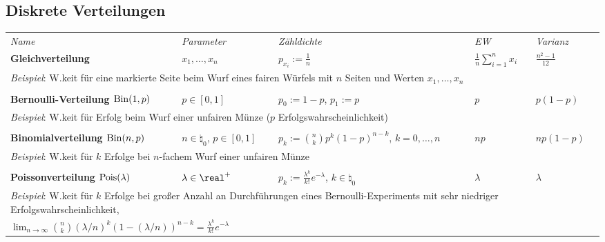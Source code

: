 \pagebreak

\begin{landscape}
\subsection{%
    Diskrete Verteilungen%
}

\begin{tabular}{p{85mm}p{40mm}p{65mm}p{20mm}p{27mm}}
    \toprule
    \emph{Name} & \emph{Parameter} & \emph{Zähldichte} & \emph{EW} & \emph{Varianz}\\

    \addlinespace[5mm]
    \midrule
    \textbf{Gleichverteilung} &
    $x_1, \dotsc, x_n$ &
    $p_{x_i} := \frac{1}{n}$ &
    $\frac{1}{n} \sum_{i=1}^n x_i$ &
    $\frac{n^2 - 1}{12}$\\
    \multicolumn{5}{l}{\emph{Beispiel}:
    W.keit für eine markierte Seite beim Wurf eines fairen Würfels mit $n$ Seiten und
    Werten $x_1, \dotsc, x_n$}\\
    \multicolumn{5}{l}{}\\

    \addlinespace[5mm]
    \midrule
    \textbf{Bernoulli-Verteilung $\operatorname{Bin}(1, p)$} &
    $p \in [0, 1]$ &
    $p_0 := 1-p$, $p_1 := p$ &
    $p$ &
    $p(1-p)$\\
    \multicolumn{5}{l}{\emph{Beispiel}:
    W.keit für Erfolg beim Wurf einer unfairen Münze ($p$ Erfolgswahrscheinlichkeit)}\\
    \multicolumn{5}{l}{}\\

    \addlinespace[5mm]
    \midrule
    \textbf{Binomialverteilung $\operatorname{Bin}(n, p)$} &
    $n \in \natural_0$, $p \in [0, 1]$ &
    $p_k := \binom{n}{k} p^k (1-p)^{n-k}$, $k = 0, \dotsc, n$ &
    $np$ &
    $np(1-p)$\\
    \multicolumn{5}{l}{\emph{Beispiel}:
    W.keit für $k$ Erfolge bei $n$-fachem Wurf einer unfairen Münze}\\
    \multicolumn{5}{l}{}\\

    \addlinespace[5mm]
    \midrule
    \textbf{Poissonverteilung $\operatorname{Pois}(\lambda)$} &
    $\lambda \in \real^+$ &
    $p_k := \frac{\lambda^k}{k!} e^{-\lambda}$, $k \in \natural_0$ &
    $\lambda$ &
    $\lambda$\\
    \multicolumn{5}{l}{\emph{Beispiel}:
    W.keit für $k$ Erfolge bei großer Anzahl an Durchführungen eines
    Bernoulli-Experiments mit sehr niedriger Erfolgswahrscheinlichkeit,}\\
    \multicolumn{5}{l}{$\lim_{n \to \infty}
    \binom{n}{k} (\lambda/n)^k (1-(\lambda/n))^{n-k} = \frac{\lambda^k}{k!} e^{-\lambda}$}
    \\


\end{tabular}
\end{landscape}
